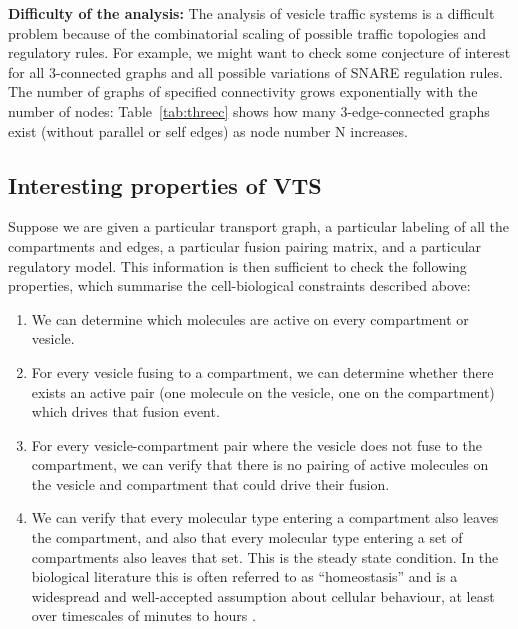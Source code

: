 
\textbf{Difficulty of the analysis:}
The analysis of vesicle traffic systems is a difficult problem
because of the combinatorial scaling of possible traffic topologies and regulatory rules. 
%
For example, we might want to check some conjecture of interest for all 3-connected graphs and
all possible variations of SNARE regulation rules. 
%
The number of graphs of specified connectivity grows exponentially with the number of nodes: Table~\ref{tab:threec} shows how many 3-edge-connected graphs~\cite{a052448-oeis} exist (without parallel or self edges) as node number N increases.

\subsection{Interesting properties of VTS}
Suppose we are given a particular transport graph, a particular labeling of all the compartments and edges, a particular fusion pairing matrix, and a particular regulatory model. This information is then sufficient to check the following properties, which summarise the cell-biological constraints described above:
\begin{enumerate}
	\item We can determine which molecules are active on every compartment or vesicle.
	\item For every vesicle fusing to a compartment, we can determine whether there exists an active pair (one molecule on the vesicle, one on the compartment) which drives that fusion event.
	\item For every vesicle-compartment pair where the vesicle does not fuse to the compartment, we can verify that there is no pairing of active molecules on the
	vesicle and compartment that could drive their fusion.
	\item We can verify that every molecular type entering a compartment also leaves the compartment, and also that every molecular type entering a set of compartments also leaves that set. This is the steady state condition. In the biological literature this is often referred to as “homeostasis” and is a widespread and well-accepted assumption about cellular behaviour, at least over timescales of minutes to hours \cite{mani2016stacking}.
\end{enumerate}

